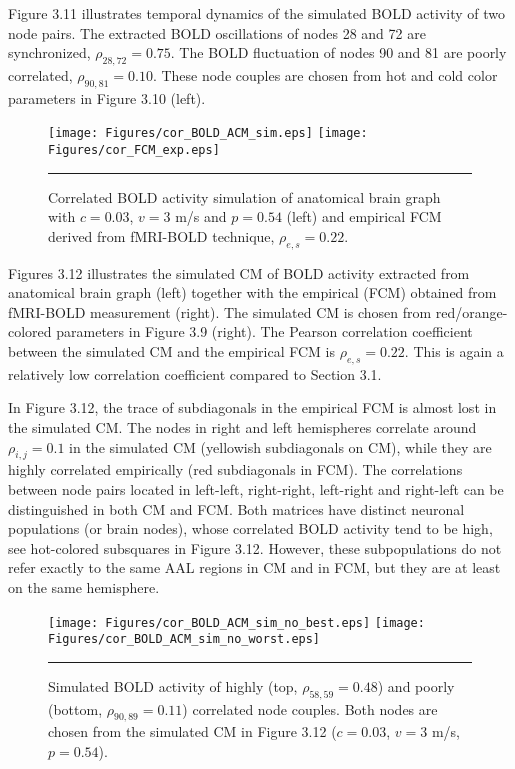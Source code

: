 Figure 3.11 illustrates temporal dynamics of the simulated BOLD activity of two node pairs. The extracted BOLD oscillations of nodes 28 and 72 are synchronized, $\rho_{28,72}=0.75$. The BOLD fluctuation of nodes 90 and 81 are poorly correlated, $\rho_{90,81}=0.10$. These node couples are chosen from hot and cold color parameters in Figure 3.10 (left).

\begin{figure}[htbp]
 
  \centering
	 \texttt{[image: Figures/cor\_BOLD\_ACM\_sim.eps]} 
   	 \texttt{[image: Figures/cor\_FCM\_exp.eps]} 

    \rule{35em}{0.5pt}
  \caption[High Correlated BOLD Simulation, ACM]{Correlated BOLD activity simulation of anatomical brain graph with $c=0.03$, $v=3$ m/s and $p=0.54$ (left) and empirical FCM derived from fMRI-BOLD technique, $\rho_{e,s} = 0.22$.} 
    \label{fig:High Correlated BOLD Simulation, ACM}
 	
\end{figure}  

Figures 3.12 illustrates the simulated CM of BOLD activity extracted from anatomical brain graph (left) together with the empirical (FCM) obtained from fMRI-BOLD measurement (right). The simulated CM is chosen from red/orange-colored parameters in Figure 3.9 (right). The Pearson correlation coefficient between the simulated CM and the empirical FCM is $\rho_{e,s} = 0.22$. This is again a relatively low correlation coefficient compared to Section 3.1. 

In Figure 3.12, the trace of subdiagonals in the empirical FCM is almost lost in the simulated CM. The nodes in right and left hemispheres correlate around $\rho_{i,j}=0.1$ in the simulated CM (yellowish subdiagonals on CM), while they are highly correlated empirically (red subdiagonals in FCM). The correlations between node pairs located in left-left, right-right, left-right and right-left can be distinguished in both CM and FCM. Both matrices have distinct neuronal populations (or brain nodes), whose correlated BOLD activity tend to be high, see hot-colored subsquares in Figure 3.12. However, these subpopulations do not refer exactly to the same AAL regions in CM and in FCM, but they are at least on the same hemisphere. 

\begin{figure}[htbp]
 
  \centering
	 \texttt{[image: Figures/cor\_BOLD\_ACM\_sim\_no\_best.eps]} 
   	 \texttt{[image: Figures/cor\_BOLD\_ACM\_sim\_no\_worst.eps]} 

    \rule{35em}{0.5pt}
  \caption[BOLD Activity Node Dynamics, ACM]{Simulated BOLD activity of highly (top, $\rho_{58,59}=0.48$) and poorly (bottom, $\rho_{90,89}=0.11$) correlated node couples. Both nodes are chosen from the simulated CM in Figure 3.12 ($c=0.03$, $v=3$ m/s, $p=0.54$).} 
    \label{fig:BOLD Activity Node Dynamics, ACM}
 	
\end{figure} 



